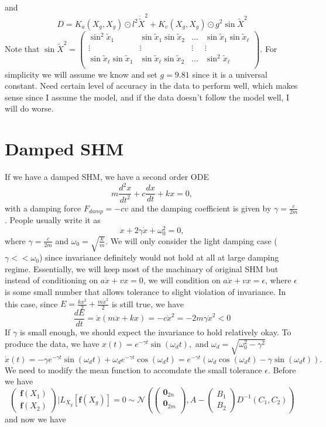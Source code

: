 \documentclass{article}
\begin{document}
and 
$$
D = K_a(X_g, X_g) \odot l^2\dot{\tilde{X}}^2 + K_v(X_g, X_g) \odot g^2\sin\tilde{X}^2
$$
Note that $\sin\tilde{X}^2=\begin{pmatrix}
  \sin^2\tilde{x}_1 & \sin\tilde{x}_1\sin\tilde{x}_2 & \dots & \sin\tilde{x}_1\sin\tilde{x}_{\ell} \\
  \vdots & \vdots & \vdots & \vdots \\
  \sin\tilde{x}_{\ell}\sin\tilde{x}_1 & \sin\tilde{x}_{\ell}\sin\tilde{x}_2 & \dots & \sin^2\tilde{x}_{\ell} \\
\end{pmatrix}.$ 
For simplicity we will assume we know and set $g=9.81$ since it is a universal constant.
Need certain level of accuracy in the data to perform well, which makes sense since I assume the model, and if the data doesn't follow the model well, I will do worse.


\section*{Damped SHM}
If we have a damped SHM, we have a second order ODE 
$$
m\frac{d^2x}{dt^2}+c\frac{dx}{dt}+kx=0,
$$ with a damping force $F_{damp}=-cv$ and the damping coefficient is given by $\gamma=\frac{c}{2m}$.
People usually write it as 
$$
\ddot{x}+2\gamma\dot{x}+\omega_0^2 = 0, 
$$ where $\gamma=\frac{c}{2m}$ and $\omega_0=\sqrt{\frac{k}{m}}.$
We will only consider the light damping case ($\gamma << \omega_0$) since invariance definitely would not hold at all at large damping regime.
Essentially, we will keep most of the machinary of original SHM but instead of conditioning on $a\dot{x}+vx=0$, we will condition on $a\dot{x}+vx=\epsilon$, where $\epsilon$ is some small number that allows tolerance to slight violation of invariance.
In this case, since $E=\frac{kx^2}{2}+\frac{m\dot{x}^2}{2}$ is still true, we have $$\frac{dE}{dt}=\dot{x}(m\ddot{x}+kx)=-c\dot{x}^2=-2m\gamma\dot{x}^2<0$$
If $\gamma$ is small enough, we should expect the invariance to hold relatively okay.
To produce the data, we have $x(t)=e^{-\gamma t}\sin(\omega_dt),$ and $\omega_d = \sqrt{\omega_0^2-\gamma^2}$ $\dot{x}(t)=-\gamma e^{-\gamma t}\sin(\omega_dt)+\omega_de^{-\gamma t}\cos(\omega_dt)=e^{-\gamma t}(\omega_d\cos(\omega_dt)-\gamma \sin(\omega_dt)).$
We need to modify the mean function to accomdate the small tolerance $\epsilon.$
Before we have
$$
\begin{pmatrix}
  \mathbf{f}(X_1)\\
  \mathbf{f}(X_2)
\end{pmatrix}|L_{X_g}[\mathbf{f}(X_g)]=0
\sim\mathcal{N}
\left(
\begin{pmatrix}
  \mathbf{0}_{2n}\\
  \mathbf{0}_{2m}\\
\end{pmatrix}
,
A-\begin{pmatrix}
  B_1 \\B_2
\end{pmatrix}D^{-1}\left(C_1, C_2\right)
\right)
$$
and now we have 
\end{document}

